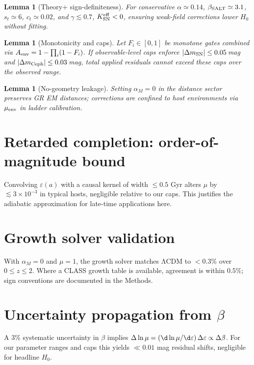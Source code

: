 \documentclass[aps,prd,preprint,onecolumn,longbibliography,nofootinbib]{revtex4-2}
\theoremstyle{plain}
\newtheorem{lemma}[theorem]{Lemma}
\theoremstyle{remark}
\newcommand{\Hzero}{H_0}
\newcommand{\alM}{\alpha_{\!M}}
\newcommand{\be}{\beta}
\newcommand{\beS}{\beta_{\rm SALT}}
\newcommand{\eps}{\varepsilon}
\begin{document}
\begin{lemma}[Theory+ sign-definiteness]\label{lem:theoryplus-sign}
For conservative $\alpha\simeq0.14$, $\beS\simeq3.1$, $s_t\simeq6$, $c_t\simeq0.02$, and $\gamma\lesssim0.7$, $K^{\rm eff}_{\rm SN}<0$, ensuring weak-field corrections lower $\Hzero$ without fitting.
\end{lemma}

\begin{lemma}[Monotonicity and caps]\label{lem:gates-caps}
Let $F_i\in[0,1]$ be monotone gates combined via $A_{\rm env}=1-\prod_i(1-F_i)$. If observable-level caps enforce $|\Delta m_{\rm SN}|\le 0.05$\,mag and $|\Delta m_{\rm Ceph}|\le 0.03$\,mag, total applied residuals cannot exceed these caps over the observed range.
\end{lemma}

\begin{lemma}[No-geometry leakage]\label{lem:no-geometry}
Setting $\alM=0$ in the distance sector preserves GR EM distances; corrections are confined to host environments via $\mu_{\rm env}$ in ladder calibration.
\end{lemma}

\section{Retarded completion: order-of-magnitude bound}
Convolving $\eps(a)$ with a causal kernel of width $\le 0.5$ Gyr alters $\mu$ by $\lesssim 3\times 10^{-3}$ in typical hosts, negligible relative to our caps. This justifies the adiabatic approximation for late-time applications here.

\section{Growth solver validation}
With $\alM=0$ and $\mu=1$, the growth solver matches ΛCDM to $<0.3\%$ over $0\!\le\!z\!\le\!2$. Where a CLASS growth table is available, agreement is within $0.5\%$; sign conventions are documented in the Methods.

\section{Uncertainty propagation from $\be$}
A $3\%$ systematic uncertainty in $\be$ implies $\Delta \ln\mu = (\d \ln\mu/\d \eps)\,\Delta\eps \propto \Delta\be$. For our parameter ranges and caps this yields $\ll 0.01$ mag residual shifts, negligible for headline $\Hzero$.
\end{document}
